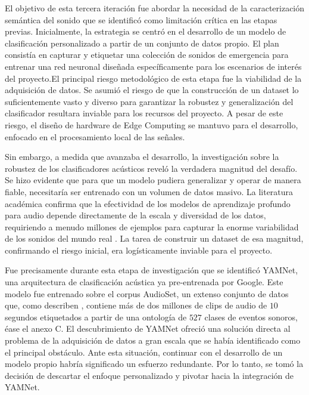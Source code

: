 

El objetivo de esta tercera iteración fue abordar la necesidad de la caracterización semántica del sonido que se identificó como limitación crítica en las etapas previas. Inicialmente, la estrategia se centró en el desarrollo de un modelo de clasificación personalizado a partir de un conjunto de datos propio. El plan consistía en capturar y etiquetar una colección de sonidos de emergencia para entrenar una red neuronal diseñada específicamente para los escenarios de interés del proyecto.El principal riesgo metodológico de esta etapa fue la viabilidad de la adquisición de datos. Se asumió el riesgo de que la construcción de un dataset lo suficientemente vasto y diverso para garantizar la robustez y generalización del clasificador resultara inviable para los recursos del proyecto. A pesar de este riesgo, el diseño de hardware de Edge Computing se mantuvo para el desarrollo, enfocado en el procesamiento local de las señales.

Sin embargo, a medida que avanzaba el desarrollo, la investigación sobre la robustez de los clasificadores acústicos reveló la verdadera magnitud del desafío. Se hizo evidente que para que un modelo pudiera generalizar y operar de manera fiable, necesitaría ser entrenado con un volumen de datos masivo. La literatura académica confirma que la efectividad de los modelos de aprendizaje profundo para audio depende directamente de la escala y diversidad de los datos, requiriendo a menudo millones de ejemplos para capturar la enorme variabilidad de los sonidos del mundo real \cite{gemmeke2017audio}. La tarea de construir un dataset de esa magnitud, confirmando el riesgo inicial, era logísticamente inviable para el proyecto.

Fue precisamente durante esta etapa de investigación que se identificó YAMNet, una arquitectura de clasificación acústica ya pre-entrenada por Google. Este modelo fue entrenado sobre el corpus AudioSet, un extenso conjunto de datos que, como describen \citeauthor{gemmeke2017audio} \citeyear{gemmeke2017audio}, contiene más de dos millones de clips de audio de $10$ segundos etiquetados a partir de una ontología de $527$ clases de eventos sonoros, éase el anexo C. El descubrimiento de YAMNet ofreció una solución directa al problema de la adquisición de datos a gran escala que se había identificado como el principal obstáculo. Ante esta situación, continuar con el desarrollo de un modelo propio habría significado un esfuerzo redundante. Por lo tanto, se tomó la decisión de descartar el enfoque personalizado y pivotar hacia la integración de YAMNet.

